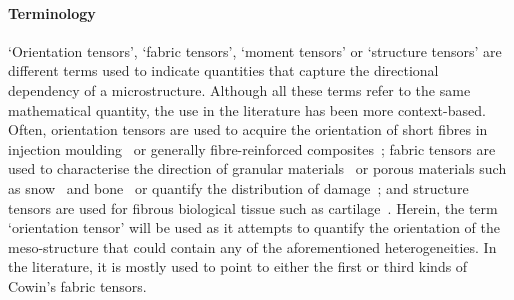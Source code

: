 	\paragraph{Terminology} `Orientation tensors', `fabric tensors', `moment tensors' or `structure tensors' are different terms used to indicate quantities that capture the directional dependency of a microstructure. Although all these terms refer to the same mathematical quantity, the use in the literature has been more context-based. Often, orientation tensors are used to acquire the orientation of short fibres in injection moulding~\autocite{Advani.1987} or generally fibre-reinforced composites~\autocite{Muller.2016b}; fabric tensors are used to characterise the direction of granular materials~\autocite{Millet.2007} or porous materials such as snow~\autocite{Srivastava.2010} and bone~\autocite{Odgaard.1997} or quantify the distribution of damage~\autocite{Krajcinovic.2000}; and structure tensors are used for fibrous biological tissue such as cartilage~\autocite{Tomic.2014}. Herein, the term `orientation tensor' will be used as it attempts to quantify the orientation of the meso-structure that could contain any of the aforementioned heterogeneities. In the literature, it is mostly used to point to either the first or third kinds of Cowin's fabric tensors.
	
